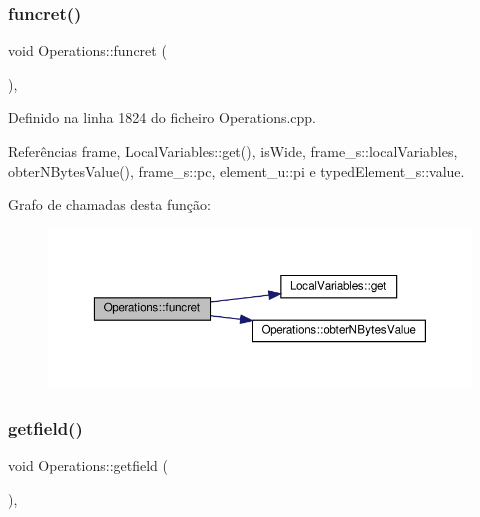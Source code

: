 \subsubsection{\texorpdfstring{funcret()}{funcret()}}
{\footnotesize\ttfamily void Operations\+::funcret (\begin{DoxyParamCaption}{ }\end{DoxyParamCaption})\hspace{0.3cm}{\ttfamily [static]}, {\ttfamily [private]}}



Definido na linha 1824 do ficheiro Operations.\+cpp.



Referências frame, Local\+Variables\+::get(), is\+Wide, frame\+\_\+s\+::local\+Variables, obter\+N\+Bytes\+Value(), frame\+\_\+s\+::pc, element\+\_\+u\+::pi e typed\+Element\+\_\+s\+::value.

Grafo de chamadas desta função\+:\nopagebreak
\begin{figure}[H]
\begin{center}
\leavevmode
\includegraphics[width=350pt]{classOperations_a1880a30623072f8388be782dcf1a390e_cgraph}
\end{center}
\end{figure}
\mbox{\label{classOperations_a0bb399fe0f64dc21699132c092560e19}} 
\subsubsection{\texorpdfstring{getfield()}{getfield()}}
{\footnotesize\ttfamily void Operations\+::getfield (\begin{DoxyParamCaption}{ }\end{DoxyParamCaption})\hspace{0.3cm}{\ttfamily [static]}, {\ttfamily [private]}}



